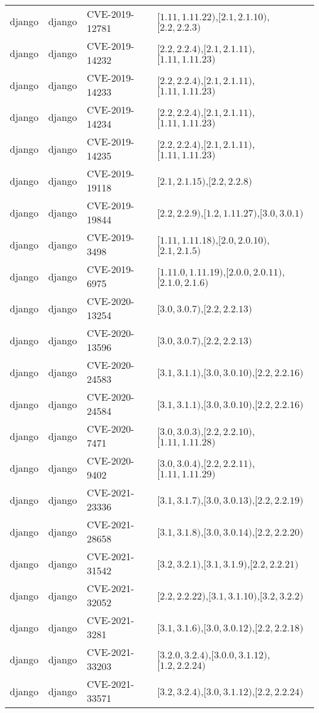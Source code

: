 \begin{tabular}{llll}
django & django & CVE-2019-12781 & $[1.11,1.11.22)$,$[2.1,2.1.10)$,$[2.2,2.2.3)$ \\
django & django & CVE-2019-14232 & $[2.2,2.2.4)$,$[2.1,2.1.11)$,$[1.11,1.11.23)$ \\
django & django & CVE-2019-14233 & $[2.2,2.2.4)$,$[2.1,2.1.11)$,$[1.11,1.11.23)$ \\
django & django & CVE-2019-14234 & $[2.2,2.2.4)$,$[2.1,2.1.11)$,$[1.11,1.11.23)$ \\
django & django & CVE-2019-14235 & $[2.2,2.2.4)$,$[2.1,2.1.11)$,$[1.11,1.11.23)$ \\
django & django & CVE-2019-19118 & $[2.1,2.1.15)$,$[2.2,2.2.8)$ \\
django & django & CVE-2019-19844 & $[2.2,2.2.9)$,$[1.2,1.11.27)$,$[3.0,3.0.1)$ \\
django & django & CVE-2019-3498 & $[1.11,1.11.18)$,$[2.0,2.0.10)$,$[2.1,2.1.5)$ \\
django & django & CVE-2019-6975 & $[1.11.0,1.11.19)$,$[2.0.0,2.0.11)$,$[2.1.0,2.1.6)$ \\
django & django & CVE-2020-13254 & $[3.0,3.0.7)$,$[2.2,2.2.13)$ \\
django & django & CVE-2020-13596 & $[3.0,3.0.7)$,$[2.2,2.2.13)$ \\
django & django & CVE-2020-24583 & $[3.1,3.1.1)$,$[3.0,3.0.10)$,$[2.2,2.2.16)$ \\
django & django & CVE-2020-24584 & $[3.1,3.1.1)$,$[3.0,3.0.10)$,$[2.2,2.2.16)$ \\
django & django & CVE-2020-7471 & $[3.0,3.0.3)$,$[2.2,2.2.10)$,$[1.11,1.11.28)$ \\
django & django & CVE-2020-9402 & $[3.0,3.0.4)$,$[2.2,2.2.11)$,$[1.11,1.11.29)$ \\
django & django & CVE-2021-23336 & $[3.1,3.1.7)$,$[3.0,3.0.13)$,$[2.2,2.2.19)$ \\
django & django & CVE-2021-28658 & $[3.1,3.1.8)$,$[3.0,3.0.14)$,$[2.2,2.2.20)$ \\
django & django & CVE-2021-31542 & $[3.2,3.2.1)$,$[3.1,3.1.9)$,$[2.2,2.2.21)$ \\
django & django & CVE-2021-32052 & $[2.2,2.2.22)$,$[3.1,3.1.10)$,$[3.2,3.2.2)$ \\
django & django & CVE-2021-3281 & $[3.1,3.1.6)$,$[3.0,3.0.12)$,$[2.2,2.2.18)$ \\
django & django & CVE-2021-33203 & $[3.2.0,3.2.4)$,$[3.0.0,3.1.12)$,$[1.2,2.2.24)$ \\
django & django & CVE-2021-33571 & $[3.2,3.2.4)$,$[3.0,3.1.12)$,$[2.2,2.2.24)$ \\

\end{tabular}
